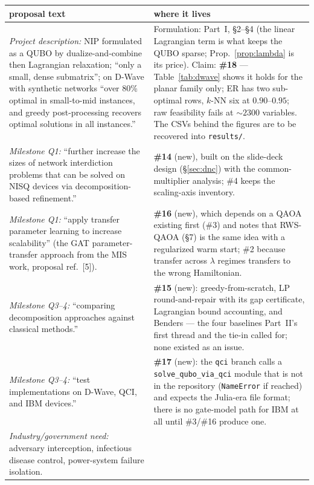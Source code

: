 \documentclass[11pt]{article}
\newcommand{\code}[1]{\texttt{#1}}
\begin{document}
\begin{table}[h]
\centering
\small
\begin{tabular}{p{}p{}}
\toprule
proposal text & where it lives \\
\midrule
\emph{Project description:} NIP formulated as a QUBO by dualize-and-combine then Lagrangian relaxation; ``only a small, dense submatrix''; on D-Wave with synthetic networks ``over 80\% optimal in small-to-mid instances, and greedy post-processing recovers optimal solutions in all instances.'' &
Formulation: Part~I, \S2--\S4 (the linear Lagrangian term is what keeps the QUBO sparse; Prop.~\ref{prop:lambda} is its price). Claim: \textbf{\#18} --- Table~\ref{tab:dwave} shows it holds for the planar family only; ER has two sub-optimal rows, $k$-NN six at $0.90$--$0.95$; raw feasibility fails at $\sim 2300$ variables. The CSVs behind the figures are to be recovered into \code{results/}. \\
\midrule
\emph{Milestone Q1:} ``further increase the sizes of network interdiction problems that can be solved on NISQ devices via decomposition-based refinement.'' &
\textbf{\#14} (new), built on the slide-deck design (\S\ref{sec:dnc}) with the common-multiplier analysis; \#4 keeps the scaling-axis inventory. \\
\midrule
\emph{Milestone Q1:} ``apply transfer parameter learning to increase scalability'' (the GAT parameter-transfer approach from the MIS work, proposal ref.~[5]). &
\textbf{\#16} (new), which depends on a QAOA existing first (\#3) and notes that RWS-QAOA (\S7) is the same idea with a regularized warm start; \#2 because transfer across $\lambda$ regimes transfers to the wrong Hamiltonian. \\
\midrule
\emph{Milestone Q3--4:} ``comparing decomposition approaches against classical methods.'' &
\textbf{\#15} (new): greedy-from-scratch, LP round-and-repair with its gap certificate, Lagrangian bound accounting, and Benders --- the four baselines Part~II's first thread and the tie-in called for; none existed as an issue. \\
\midrule
\emph{Milestone Q3--4:} ``test implementations on D-Wave, QCI, and IBM devices.'' &
\textbf{\#17} (new): the \code{qci} branch calls a \code{solve\_qubo\_via\_qci} module that is not in the repository (\code{NameError} if reached) and expects the Julia-era file format; there is no gate-model path for IBM at all until \#3/\#16 produce one. \\
\midrule
\emph{Industry/government need:} adversary interception, infectious disease control, power-system failure isolation. &

\end{tabular}
\end{table}
\end{document}
